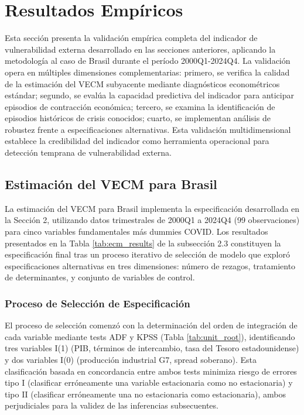 \documentclass[3p,11pt,draft,natbib=false]{elsarticle}
\begin{document}
\section{Resultados Empíricos}
\label{sec:resultados}

Esta sección presenta la validación empírica completa del indicador de vulnerabilidad externa desarrollado en las secciones anteriores, aplicando la metodología al caso de Brasil durante el período 2000Q1-2024Q4. La validación opera en múltiples dimensiones complementarias: primero, se verifica la calidad de la estimación del VECM subyacente mediante diagnósticos econométricos estándar; segundo, se evalúa la capacidad predictiva del indicador para anticipar episodios de contracción económica; tercero, se examina la identificación de episodios históricos de crisis conocidos; cuarto, se implementan análisis de robustez frente a especificaciones alternativas. Esta validación multidimensional establece la credibilidad del indicador como herramienta operacional para detección temprana de vulnerabilidad externa.

\subsection{Estimación del VECM para Brasil}
\label{sec:estimacion}

La estimación del VECM para Brasil implementa la especificación desarrollada en la Sección 2, utilizando datos trimestrales de 2000Q1 a 2024Q4 (99 observaciones) para cinco variables fundamentales más dummies COVID. Los resultados presentados en la Tabla \ref{tab:ecm_results} de la subsección 2.3 constituyen la especificación final tras un proceso iterativo de selección de modelo que exploró especificaciones alternativas en tres dimensiones: número de rezagos, tratamiento de determinantes, y conjunto de variables de control.

\subsubsection{Proceso de Selección de Especificación}

El proceso de selección comenzó con la determinación del orden de integración de cada variable mediante tests ADF y KPSS (Tabla \ref{tab:unit_root}), identificando tres variables I(1) (PIB, términos de intercambio, tasa del Tesoro estadounidense) y dos variables I(0) (producción industrial G7, spread soberano). Esta clasificación basada en concordancia entre ambos tests minimiza riesgo de errores tipo I (clasificar erróneamente una variable estacionaria como no estacionaria) y tipo II (clasificar erróneamente una no estacionaria como estacionaria), ambos perjudiciales para la validez de las inferencias subsecuentes.
\end{document}
